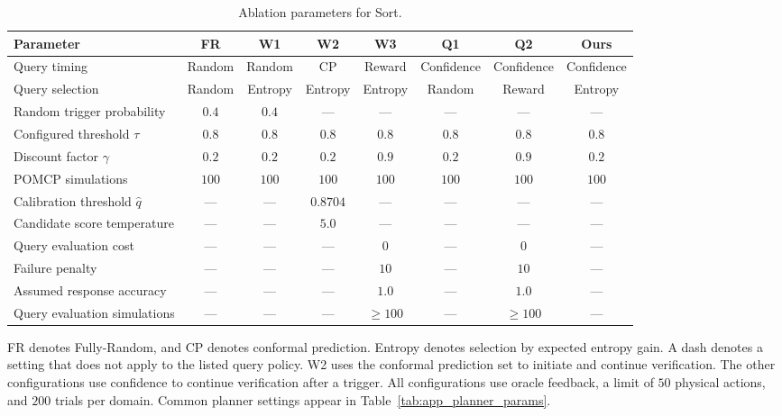 \begin{table}[!htbp]
\centering
\caption{Ablation parameters for Sort.}
\label{tab:app_ablation_params_waste}
\small
\setlength{\tabcolsep}{4pt}
\renewcommand{\arraystretch}{1.12}
\begin{tabular*}{\textwidth}{@{\extracolsep{\fill}}lccccccc@{}}
\toprule
Parameter & FR & W1 & W2 & W3 & Q1 & Q2 & \textbf{Ours} \\
\midrule
Query timing & Random & Random & CP & Reward & Confidence & Confidence & Confidence \\
Query selection & Random & Entropy & Entropy & Entropy & Random & Reward & Entropy \\
Random trigger probability & $0.4$ & $0.4$ & --- & --- & --- & --- & --- \\
Configured threshold $\tau$ & $0.8$ & $0.8$ & $0.8$ & $0.8$ & $0.8$ & $0.8$ & $0.8$ \\
Discount factor $\gamma$ & $0.2$ & $0.2$ & $0.2$ & $0.9$ & $0.2$ & $0.9$ & $0.2$ \\
POMCP simulations & $100$ & $100$ & $100$ & $100$ & $100$ & $100$ & $100$ \\
Calibration threshold $\hat{q}$ & --- & --- & $0.8704$ & --- & --- & --- & --- \\
Candidate score temperature & --- & --- & $5.0$ & --- & --- & --- & --- \\
Query evaluation cost & --- & --- & --- & $0$ & --- & $0$ & --- \\
Failure penalty & --- & --- & --- & $10$ & --- & $10$ & --- \\
Assumed response accuracy & --- & --- & --- & $1.0$ & --- & $1.0$ & --- \\
Query evaluation simulations & --- & --- & --- & $\geq 100$ & --- & $\geq 100$ & --- \\
\bottomrule
\end{tabular*}
\par\smallskip
\begin{minipage}{\textwidth}
\footnotesize FR denotes Fully-Random, and CP denotes conformal prediction. Entropy denotes selection by expected entropy gain. A dash denotes a setting that does not apply to the listed query policy. W2 uses the conformal prediction set to initiate and continue verification. The other configurations use confidence to continue verification after a trigger. All configurations use oracle feedback, a limit of $50$ physical actions, and $200$ trials per domain. Common planner settings appear in Table~\ref{tab:app_planner_params}.
\end{minipage}
\end{table}

